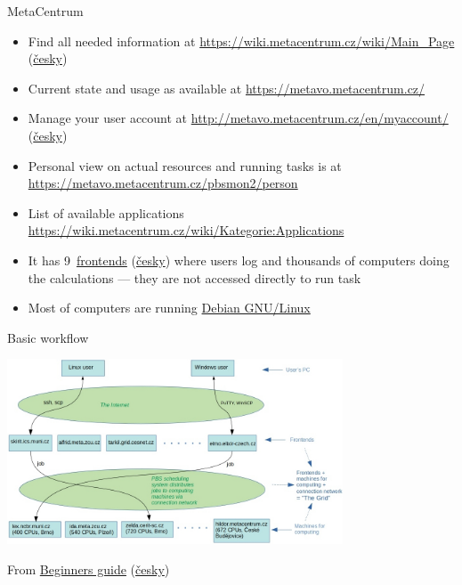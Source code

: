 \documentclass[compress, ucs, xelatex, 11pt, xcolor=x11names, aspectratio=169,
	hyperref={
		bookmarks=true,
		unicode=true,
		colorlinks=true,
		pdftitle={HybSeq course},
		plainpages=false,
		pdfauthor={Vojtech Zeisek},
		pdfsubject={Practical processing of HybSeq target enrichment sequencing data on computing grids like MetaCentrum},
		pdfcreator={XeLaTeX},
		pdfkeywords={BASH, command line, GNU, HybSeq, Linux, MetaCentrum, sequencing shell, target enrichment},
		linkcolor=Turquoise4, %
		anchorcolor=DodgerBlue4, %
		citecolor=DodgerBlue4, %
		filecolor=DodgerBlue4, %
		menucolor=Tan4, %
		urlcolor=DarkOliveGreen4, %
		pdftex},
	url={hyphens, lowtilde} %
	]{beamer}
\begin{document}
\begin{frame}{MetaCentrum}
	\begin{itemize}
		\item Find all needed information at \url{https://wiki.metacentrum.cz/wiki/Main_Page} (\href{https://wiki.metacentrum.cz/wiki/Hlavn\%C3\%AD_strana}{česky})
		\item Current state and usage as available at \url{https://metavo.metacentrum.cz/}
		\item Manage your user account at \url{http://metavo.metacentrum.cz/en/myaccount/} (\href{https://metavo.metacentrum.cz/cs/myaccount/}{česky})
		\item Personal view on actual resources and running tasks is at \url{https://metavo.metacentrum.cz/pbsmon2/person}
		\item List of available applications \url{https://wiki.metacentrum.cz/wiki/Kategorie:Applications}
		\item It has 9~\href{https://wiki.metacentrum.cz/wiki/Frontend}{frontends} (\href{https://wiki.metacentrum.cz/wiki/Celni_uzel}{česky}) where users log and thousands of computers doing the calculations --- they are not accessed directly to run task
		\item Most of computers are running \href{https://www.debian.org/}{Debian GNU/Linux}
	\end{itemize}
\end{frame}

\begin{frame}{Basic workflow}
	\begin{center}
		\includegraphics[height=5.5cm]{grid_graphics.jpg}
	\end{center}
	\begin{flushright}
		From \href{https://wiki.metacentrum.cz/wiki/Beginners_guide}{Beginners guide} (\href{https://wiki.metacentrum.cz/wiki/Pruvodce_pro_zacatecniky}{česky})
	\end{flushright}
\end{frame}
\end{document}

